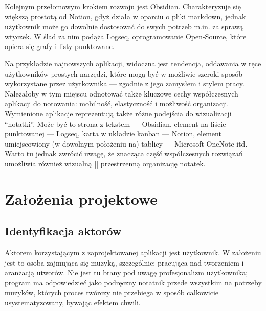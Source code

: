 \documentclass[12pt]{article}
\begin{document}
\begin{itemize}
	      Kolejnym przełomowym krokiem rozwoju jest Obsidian. Charakteryzuje się większą prostotą od Notion,
	      gdyż działa w oparciu o pliki markdown, jednak użytkownik może go dowolnie dostosować do swych potrzeb m.in.
	      za sprawą
	      wtyczek. W ślad za nim podąża Logseq, oprogramowanie Open-Source, które opiera się grafy i listy punktowane.
\end{itemize}
Na przykładzie najnowszych aplikacji, widoczna jest tendencja, oddawania w ręce użytkowników prostych narzędzi,
które mogą być w możliwie szeroki sposób wykorzystane przez użytkownika — zgodnie z jego zamysłem i stylem pracy.
Należałoby w tym miejscu odnotować także kluczowe cechy współczesnych aplikacji do notowania: mobilność, elastyczność
i możliwość organizacji.
Wymienione aplikacje reprezentują także różne podejścia do wizualizacji \enquote{notatki}.
Może być to strona z tekstem — Obsidian, element na liście punktowanej — Logseq, karta w układzie kanban — Notion,
element umiejscowiony (w dowolnym położeniu na) tablicy — Microsoft OneNote itd. Warto tu jednak zwrócić uwagę,
że znacząca część współczesnych rozwiązań umożliwia również wizualną || przestrzenną organizację notatek.

\newpage
\section{Założenia projektowe}
\subsection{Identyfikacja aktorów}
Aktorem korzystającym z zaprojektowanej aplikacji jest użytkownik.
W założeniu jest to osoba zajmująca się muzyką, szczególnie: pracująca nad tworzeniem i aranżacją utworów.
Nie jest tu brany pod uwagę profesjonalizm użytkownika; program ma odpowiedzieć jako podręczny notatnik przede wszystkim
na potrzeby muzyków, których proces twórczy nie przebiega w sposób całkowicie usystematyzowany, bywając efektem chwili.
\end{document}
